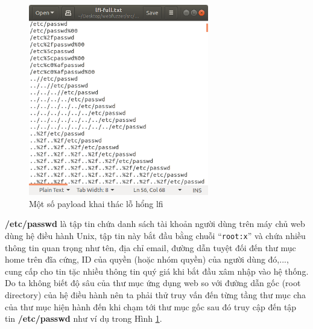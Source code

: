 \begin{figure}[H]
  \centering
    \includegraphics[width=0.7\textwidth,keepaspectratio=true]{images/lfi-payloads.png}
  \caption{Một số payload khai thác lỗ hổng \acrshort{lfi}}
  \label{fig:lfi-payloads}
\end{figure}
\textbf{/etc/passwd} là tập tin chứa danh sách tài khoản người dùng trên máy chủ web dùng hệ điều hành Unix, tập tin này bắt đầu bằng chuỗi ``\texttt{root:x}'' và chứa nhiều thông tin quan trọng như tên, địa chỉ email, đường dẫn tuyệt đối đến thư mục home trên đĩa cứng, ID của quyền (hoặc nhóm quyền) của người dùng đó,..., cung cấp cho tin tặc nhiều thông tin quý giá khi bắt đầu xâm nhập vào hệ thống. Do ta không biết độ sâu của thư mục ứng dụng web so với đường dẫn gốc (root directory) của hệ điều hành nên ta phải thử truy vấn đến từng tầng thư mục cha của thư mục hiện hành đến khi chạm tới thư mục gốc sau đó truy cập đến tập tin \textbf{/etc/passwd} như ví dụ trong Hình \ref{fig:lfi-payloads}.\par

